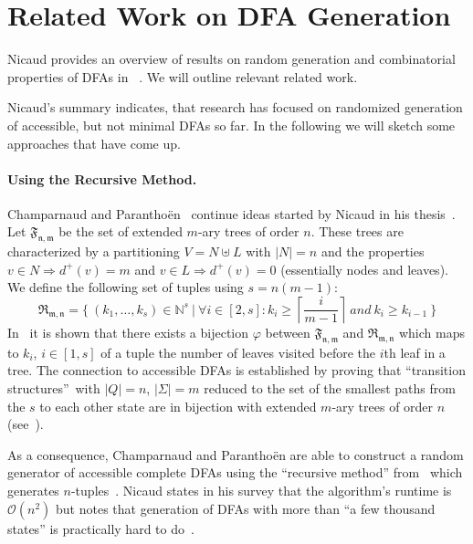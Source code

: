 \section{Related Work on DFA Generation}

Nicaud provides an overview of results on random generation and combinatorial properties of DFAs in ~\cite{Nic14}. We will outline relevant related work.

Nicaud's summary indicates, that research has focused on randomized generation of accessible, but not minimal DFAs so far. In the following we will sketch some approaches that have come up.

\paragraph*{Using the Recursive Method.}

Champarnaud and Paranthoën~\cite{CP05} continue ideas started by Nicaud in his thesis~\cite{Nic00}. Let $\mathfrak{F_{n,m}}$ be the set of extended $m$-ary trees of order $n$. These trees are characterized by a partitioning $V = N \uplus L$ with $|N| = n$ and the properties $v \in N \Rightarrow d^+(v) = m$ and $v \in L \Rightarrow d^+(v) = 0$ (essentially nodes and leaves). We define the following set of tuples using $s=n(m-1)$:
\[
    \mathfrak{R_{m,n}} = \{\ (k_1,\ldots,k_s) \in \mathbb{N}^s\ |\ \forall i\in [2,s]\colon k_i \geq \left\lceil\frac{i}{m-1}\right\rceil\ and\ k_i \geq k_{i-1}\ \}
\]
In~\cite[p. 6]{CP05} it is shown that there exists a bijection $\varphi$ between $\mathfrak{F_{n,m}}$ and $\mathfrak{R_{m,n}}$ which maps to $k_i$, $i\in[1,s]$ of a tuple the number of leaves visited before the $i$th leaf in a tree. The connection to accessible DFAs is established by proving that  ``transition structures''\footnotemark\ with $|Q|=n$, $|\Sigma|=m$ reduced to the set of the smallest paths from the $s$ to each other state are in bijection with extended $m$-ary trees of order $n$ (see~\cite[p. 8]{CP05}).

As a consequence, Champarnaud and Paranthoën are able to construct a random generator of accessible complete DFAs using the ``recursive method'' from~\cite{NW78} which generates $n$-tuples~\cite[p. 10]{CP05}. Nicaud states in his survey that the algorithm's runtime is $\mathcal{O}(n^2)$ but notes that generation of DFAs with more than ``a few thousand states'' is practically hard to do~\cite[pp. 10-11]{Nic14}.

